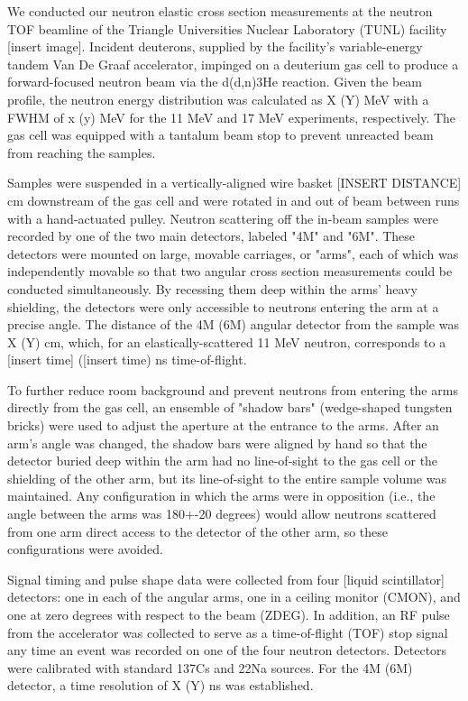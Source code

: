 We conducted our neutron elastic cross section measurements at the neutron TOF
beamline of the Triangle Universities Nuclear Laboratory (TUNL) facility [insert
image]. Incident deuterons, supplied by the facility's variable-energy tandem
Van De Graaf accelerator, impinged on a deuterium gas cell to produce a
forward-focused neutron beam via the d(d,n)3He reaction. Given the beam profile,
the neutron energy distribution was calculated as X (Y) MeV with a FWHM of x (y)
MeV for the 11 MeV and 17 MeV experiments, respectively. The gas cell was
equipped with a tantalum beam stop to prevent unreacted beam from reaching
the samples. 

Samples were suspended in a vertically-aligned wire basket [INSERT DISTANCE] cm
downstream of the gas cell and were rotated in and out of beam between
runs with a hand-actuated pulley. Neutron scattering off
the in-beam samples were recorded by one of the two main detectors, labeled "4M"
and "6M". These detectors were mounted on large, movable carriages, or "arms",
each of which was independently movable so that two angular cross section
measurements could be conducted simultaneously. By recessing them deep within
the arms' heavy shielding, the detectors were only accessible to neutrons
entering the arm at a precise angle. The distance of the 4M (6M) angular
detector from the sample was X (Y) cm, which, for an elastically-scattered
11 MeV neutron, corresponds to a [insert time] ([insert time) ns time-of-flight.

To further reduce room background and prevent neutrons from entering the arms directly
from the gas cell, an ensemble of "shadow bars" (wedge-shaped tungsten bricks)
were used to adjust the aperture at the entrance to the arms. After an arm's
angle was changed, the shadow bars were aligned by hand so that the
detector buried deep within the arm had no line-of-sight to the gas cell or the
shielding of the other arm, but its line-of-sight to the entire sample volume was
maintained. Any configuration in which the arms were in opposition (i.e., the
angle between the arms was 180+-20 degrees) would allow neutrons scattered
from one arm direct access to the detector of the other arm, so these
configurations were avoided.

Signal timing and pulse shape data were collected from four [liquid scintillator]
detectors: one in each of the angular arms, one in a ceiling monitor
(CMON), and one at zero degrees with respect to the beam (ZDEG). In addition,
an RF pulse from the accelerator was collected to serve as a time-of-flight
(TOF) stop signal any time an event was recorded on one of the four neutron
detectors. Detectors were calibrated with standard 137Cs and 22Na sources. For
the 4M (6M) detector, a time resolution of X (Y) ns was established.

